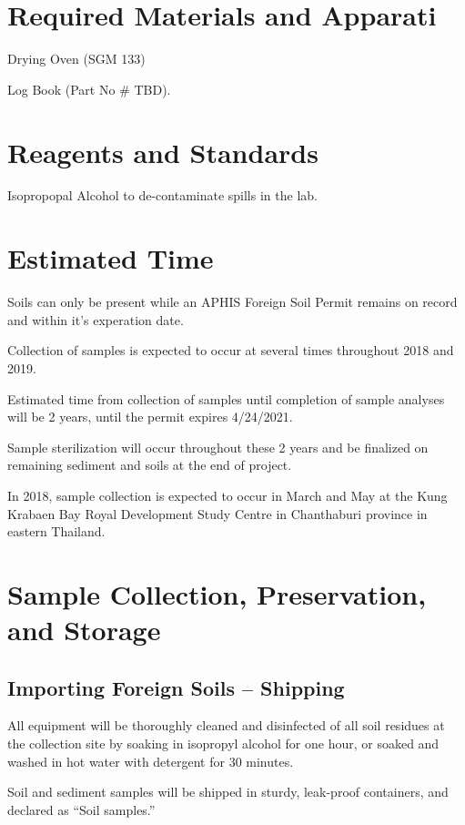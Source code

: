 \documentclass[12pt]{../SOP3}\usepackage[]{graphicx}\usepackage[]{color}
\begin{document}
\section{Required Materials and Apparati}

\NP Drying Oven (SGM 133)

\NP Log Book (Part No \# TBD).

\section{Reagents and Standards}

\NP Isopropopal Alcohol to de-contaminate spills in the lab.

\section{Estimated Time}

\NP Soils can only be present while an APHIS Foreign Soil Permit remains on record and within it's experation date.

\NP Collection of samples is expected to occur at several times throughout 2018 and 2019. 

\NP Estimated time from collection of samples until completion of sample analyses will be 2 years, until the permit expires 4/24/2021. 

\NP Sample sterilization will occur throughout these 2 years and be finalized on remaining sediment and soils at the end of project. 

\NP In 2018, sample collection is expected to occur in March and May at the Kung Krabaen Bay Royal Development Study Centre in Chanthaburi province in eastern Thailand.

\section{Sample Collection, Preservation, and Storage}

\subsection{Importing Foreign Soils -- Shipping}

\NP All equipment will be thoroughly cleaned and disinfected of all soil residues at the collection site by soaking in isopropyl alcohol for one hour, or soaked and washed in hot water with detergent for 30 minutes. 

\NP Soil and sediment samples will be shipped in sturdy, leak-proof containers, and declared as ``Soil samples.'' 
\end{document}
